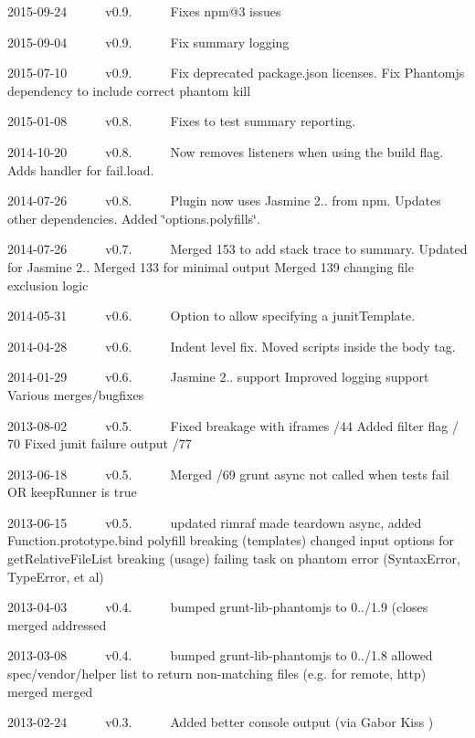 \begin{DoxyItemize}
\item 2015-\/09-\/24   v0.9.   \+Fixes npm@3 issues
\item 2015-\/09-\/04   v0.9.   \+Fix summary logging
\item 2015-\/07-\/10   v0.9.   \+Fix deprecated package.\+json licenses. Fix Phantomjs dependency to include correct phantom kill
\item 2015-\/01-\/08   v0.8.   \+Fixes to test summary reporting.
\item 2014-\/10-\/20   v0.8.   \+Now removes listeners when using the build flag. Adds handler for fail.\+load.
\item 2014-\/07-\/26   v0.8.   \+Plugin now uses Jasmine 2.. from npm. Updates other dependencies. Added \char`\"{}options.\+polyfills\char`\"{}.
\item 2014-\/07-\/26   v0.7.   \+Merged 153 to add stack trace to summary. Updated for Jasmine 2.. Merged 133 for minimal output Merged 139 changing file exclusion logic
\item 2014-\/05-\/31   v0.6.   \+Option to allow specifying a junit\+Template.
\item 2014-\/04-\/28   v0.6.   \+Indent level fix. Moved scripts inside the body tag.
\item 2014-\/01-\/29   v0.6.   \+Jasmine 2.. support Improved logging support Various merges/bugfixes
\item 2013-\/08-\/02   v0.5.   \+Fixed breakage with iframes /44 Added filter flag / 70 Fixed junit failure output /77
\item 2013-\/06-\/18   v0.5.   \+Merged /69 grunt async not called when tests fail O\+R keep\+Runner is true
\item 2013-\/06-\/15   v0.5.   updated rimraf made teardown async, added Function.\+prototype.\+bind polyfill breaking (templates) changed input options for get\+Relative\+File\+List breaking (usage) failing task on phantom error (Syntax\+Error, Type\+Error, et al)
\item 2013-\/04-\/03   v0.4.   bumped grunt-\/lib-\/phantomjs to 0../1.9 (closes merged addressed
\item 2013-\/03-\/08   v0.4.   bumped grunt-\/lib-\/phantomjs to 0../1.8 allowed spec/vendor/helper list to return non-\/matching files (e.\+g. for remote, http) merged merged
\item 2013-\/02-\/24   v0.3.   \+Added better console output (via Gabor Kiss )

\end{DoxyItemize}
